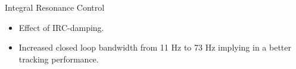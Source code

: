 \documentclass[10pt]{beamer}
\begin{document}
\begin{frame}{Integral Resonance Control}
  \begin{itemize}
    \item Effect of IRC-damping.
    \item Increased closed loop bandwidth from 11 Hz to 73 Hz implying in a better tracking performance.
  \end{itemize}
  \vspace{-1cm}
  \begin{figure}[h!]
    \centering %
  \end{figure}
\end{frame}
\end{document}
